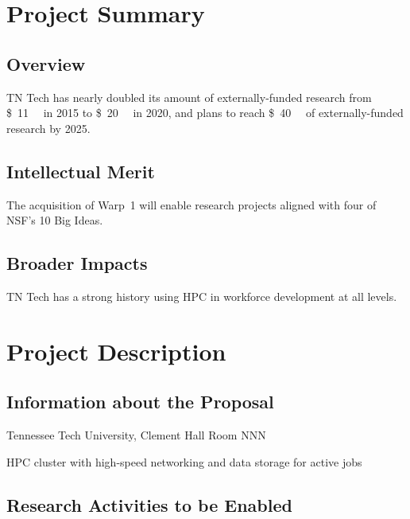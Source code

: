 \documentclass[12pt]{nsf-proposal}
\newcommand{\dol}[2][]{\SI{#2}[\$]{#1}}
\begin{document}
\chapter*{Project Summary} %

\section*{Overview}

TN Tech has nearly doubled its amount of externally-funded research from \dol[\mega\relax]{11} in 2015 to \dol[\mega\relax]{20} in 2020, and plans to reach \dol[\mega\relax]{40} of externally-funded research by 2025.

\section*{Intellectual Merit}

The acquisition of Warp~1 will enable research projects aligned with four of NSF's 10 Big Ideas.

\section*{Broader Impacts}

TN Tech has a strong history using HPC in workforce development at all levels.

\chapter{Project Description}

\section{Information about the Proposal}

\begin{description}[labelwidth=1.7in,leftmargin=\labelwidth,labelsep=0pt]
\item[Instrument Location:] Tennessee Tech University, Clement Hall Room NNN
\item[Instrument Type:] HPC cluster with high-speed networking and data storage for active jobs
\end{description}

\section{Research Activities to be Enabled}
\end{document}

